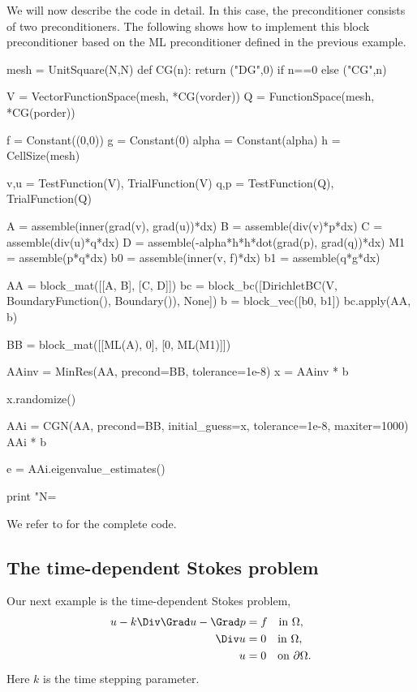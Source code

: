 We will now describe the code in detail.  In this case, the
preconditioner consists of two preconditioners.  The following shows
how to implement this block preconditioner
based on the ML preconditioner defined in the previous example.
\begin{python}
mesh = UnitSquare(N,N)
def CG(n):
    return ("DG",0) if n==0 else ("CG",n)

V = VectorFunctionSpace(mesh, *CG(vorder))
Q = FunctionSpace(mesh, *CG(porder))

f = Constant((0,0))
g = Constant(0)
alpha = Constant(alpha)
h = CellSize(mesh)

v,u = TestFunction(V), TrialFunction(V)
q,p = TestFunction(Q), TrialFunction(Q)

A  = assemble(inner(grad(v), grad(u))*dx)
B  = assemble(div(v)*p*dx)
C  = assemble(div(u)*q*dx)
D  = assemble(-alpha*h*h*dot(grad(p), grad(q))*dx)
M1 = assemble(p*q*dx)
b0 = assemble(inner(v, f)*dx)
b1 = assemble(q*g*dx)

AA = block_mat([[A, B],
                [C, D]])
bc = block_bc([DirichletBC(V, BoundaryFunction(), Boundary()), None])
b = block_vec([b0, b1])
bc.apply(AA, b)

BB = block_mat([[ML(A),  0],
                [0, ML(M1)]])


AAinv = MinRes(AA, precond=BB, tolerance=1e-8)
x = AAinv * b

x.randomize()

AAi = CGN(AA, precond=BB, initial_guess=x, tolerance=1e-8, maxiter=1000)
AAi * b

e = AAi.eigenvalue_estimates()

print "N=%
\end{python}
We refer to  for the complete code.

\subsection{The time-dependent Stokes problem}
Our next example is the time-dependent Stokes problem,
\begin{align}
u - k \Div \Grad u - \Grad p &= f \quad \mbox{in} \ \Omega, \\
\Div u &= 0 \quad \mbox{in} \  \Omega, \\
             u &= 0   \quad \mbox{on} \  \partial \Omega.
\end{align}
Here $k$ is the time stepping parameter.

